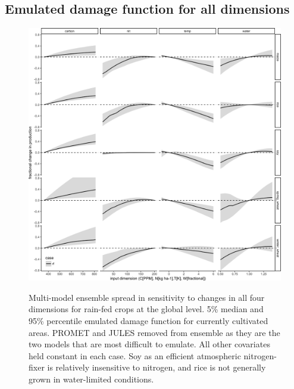 \documentclass[10pt]{article}
\begin{document}
\subsection{Emulated damage function for all dimensions}
\begin{figure}[h!]
\includegraphics[width=\textwidth]{em_CTWN_all_crops.png}\\
\caption{Multi-model ensemble spread in sensitivity to changes in all four dimensions for rain-fed crops at the global level. 5\% median and 95\% percentile emulated damage function for currently cultivated areas. PROMET and JULES removed from ensemble as they are the two models that are most difficult to emulate. All other covariates held constant in each case. Soy as an efficient atmospheric nitrogen-fixer is relatively insensitive to nitrogen, and rice is not generally grown in water-limited conditions.}
\label{fig:all_dims}
\end{figure}

\clearpage
\end{document}
